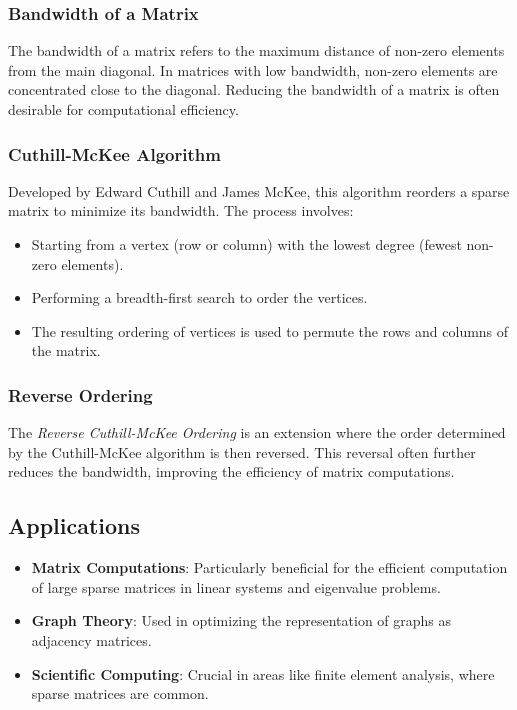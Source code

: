 \documentclass[unicode,11pt,a4paper,oneside,numbers=endperiod,openany]{scrartcl}
\begin{document}
\subsubsection{Bandwidth of a Matrix}
The bandwidth of a matrix refers to the maximum distance of non-zero elements from the main diagonal. In matrices with low bandwidth, non-zero elements are concentrated close to the diagonal. Reducing the bandwidth of a matrix is often desirable for computational efficiency.

\subsubsection{Cuthill-McKee Algorithm}
Developed by Edward Cuthill and James McKee, this algorithm reorders a sparse matrix to minimize its bandwidth. The process involves:
\begin{itemize}
    \item Starting from a vertex (row or column) with the lowest degree (fewest non-zero elements).
    \item Performing a breadth-first search to order the vertices.
    \item The resulting ordering of vertices is used to permute the rows and columns of the matrix.
\end{itemize}

\subsubsection{Reverse Ordering}
The \textit{Reverse Cuthill-McKee Ordering} is an extension where the order determined by the Cuthill-McKee algorithm is then reversed. This reversal often further reduces the bandwidth, improving the efficiency of matrix computations.

\subsection{Applications}
\begin{itemize}
    \item \textbf{Matrix Computations}: Particularly beneficial for the efficient computation of large sparse matrices in linear systems and eigenvalue problems.
    \item \textbf{Graph Theory}: Used in optimizing the representation of graphs as adjacency matrices.
    \item \textbf{Scientific Computing}: Crucial in areas like finite element analysis, where sparse matrices are common.
\end{itemize}
\end{document}
